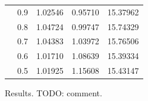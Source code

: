 \documentclass[letterpaper, 10 pt, conference]{ieeeconf}
\begin{document}
\begin{figure}[htb]
\begin{tabular}{ccRRR}
    & 0.9                       & 1.02546                    & 0.95710                      & 15.37962                   \\
    & 0.8                       & 1.04724                    & 0.99747                      & 15.74329                   \\
    & 0.7                       & 1.04383                    & 1.03972                      & 15.76506                   \\
    & 0.6                       & 1.01710                    & 1.08639                      & 15.39334                   \\
    & 0.5                       & 1.01925                    & 1.15608                      & 15.43147                  
  \end{tabular}
  \caption{Results. TODO: comment.}
  \end{figure}
\end{document}
